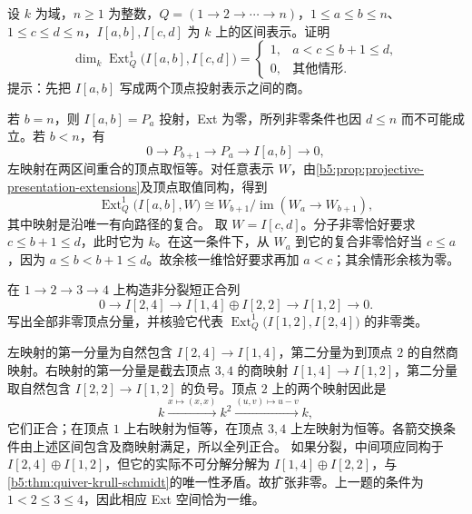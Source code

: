 \begin{exercise}\label{b5:ex:09-interval-ext}
	设 \(k\) 为域，\(n\ge1\) 为整数，\(Q=(1\to2\to\cdots\to n)\)，\(1\le a\le b\le n\)、\(1\le c\le d\le n\)，\(I[a,b],I[c,d]\) 为 \(k\) 上的区间表示。证明
	\[
		\dim_k\operatorname{Ext}^1_Q\bigl(I[a,b],I[c,d]\bigr)
		=\begin{cases}
			1,&a<c\leq b+1\leq d,\\
			0,&\text{其他情形}.
		\end{cases}
	\]
	提示：先把 \(I[a,b]\) 写成两个顶点投射表示之间的商。
\end{exercise}
\begin{solution}
	若 \(b=n\)，则 \(I[a,b]=P_a\) 投射，Ext 为零，所列非零条件也因 \(d\leq n\) 而不可能成立。若 \(b<n\)，有
	\[
		0\longrightarrow P_{b+1}\longrightarrow P_a \longrightarrow I[a,b]\longrightarrow0,
	\]
	左映射在两区间重合的顶点取恒等。对任意表示 \(W\)，由\cref{b5:prop:projective-presentation-extensions}及顶点取值同构，得到
	\[
		\operatorname{Ext}^1_Q\bigl(I[a,b],W\bigr) \cong W_{b+1}/\operatorname{im}(W_a\to W_{b+1}),
	\]
	其中映射是沿唯一有向路径的复合。 取 \(W=I[c,d]\)。分子非零恰好要求 \(c\leq b+1\leq d\)，此时它为 \(k\)。在这一条件下，从 \(W_a\) 到它的复合非零恰好当 \(c\leq a\)，因为 \(a\leq b<b+1\leq d\)。故余核一维恰好要求再加 \(a<c\)；其余情形余核为零。
\end{solution}

\begin{exercise}\label{b5:ex:09-overlapping-extension}
	在 \(1\to2\to3\to4\) 上构造非分裂短正合列
	\[
		0\longrightarrow I[2,4]\longrightarrow I[1,4]\oplus I[2,2]\longrightarrow I[1,2]\longrightarrow0.
	\]
	写出全部非零顶点分量，并核验它代表 \(\operatorname{Ext}^1_Q\bigl(I[1,2],I[2,4]\bigr)\) 的非零类。
\end{exercise}
\begin{solution}
	左映射的第一分量为自然包含 \(I[2,4]\to I[1,4]\)，第二分量为到顶点 \(2\) 的自然商映射。右映射的第一分量是截去顶点 \(3,4\) 的商映射 \(I[1,4]\to I[1,2]\)，第二分量取自然包含 \(I[2,2]\to I[1,2]\) 的负号。顶点 \(2\) 上的两个映射因此是
	\[
		k\xrightarrow{x\mapsto(x,x)}k^2 \xrightarrow{(u,v)\mapsto u-v}k,
	\]
	它们正合；在顶点 \(1\) 上右映射为恒等，在顶点 \(3,4\) 上左映射为恒等。各箭交换条件由上述区间包含及商映射满足，所以全列正合。 如果分裂，中间项应同构于 \(I[2,4]\oplus I[1,2]\)，但它的实际不可分解分解为 \(I[1,4]\oplus I[2,2]\)，与\cref{b5:thm:quiver-krull-schmidt}的唯一性矛盾。故扩张非零。上一题的条件为 \(1<2\leq3\leq4\)，因此相应 Ext 空间恰为一维。
\end{solution}

